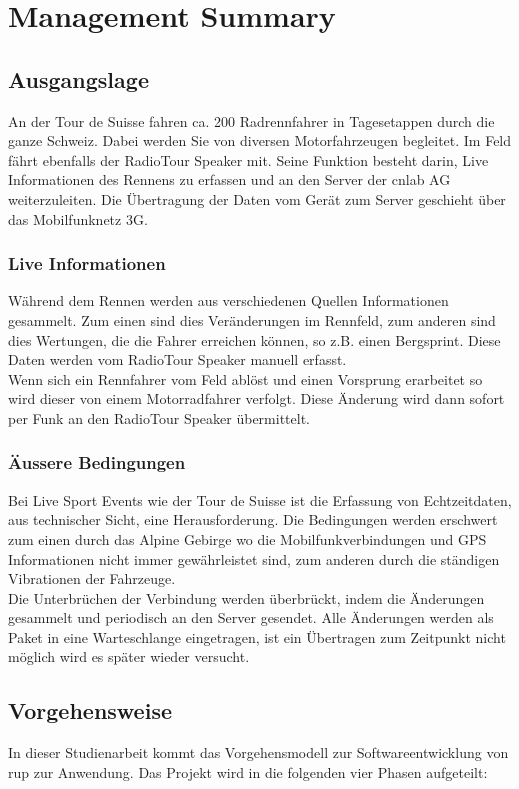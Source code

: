 \chapter*{Management Summary}

\section*{Ausgangslage}
An der Tour de Suisse fahren ca. 200 Radrennfahrer in Tagesetappen durch die ganze Schweiz. Dabei werden Sie von diversen Motorfahrzeugen begleitet. Im Feld fährt ebenfalls der RadioTour Speaker mit. Seine Funktion besteht darin, Live Informationen des Rennens zu erfassen und an den Server der cnlab AG weiterzuleiten.  Die Übertragung der Daten vom Gerät zum Server geschieht über das Mobilfunknetz 3G.

\subsection*{Live Informationen}
Während dem Rennen werden aus verschiedenen Quellen Informationen gesammelt. Zum einen sind dies Veränderungen im Rennfeld, zum anderen sind dies Wertungen, die die Fahrer erreichen können, so z.B. einen Bergsprint. Diese Daten werden vom RadioTour Speaker manuell erfasst.
\\
Wenn sich ein Rennfahrer vom Feld ablöst und einen Vorsprung erarbeitet so wird dieser von einem Motorradfahrer verfolgt. Diese Änderung wird dann sofort per Funk an den RadioTour Speaker übermittelt.

\subsection*{Äussere Bedingungen}
Bei Live Sport Events wie der Tour de Suisse ist die Erfassung von Echtzeitdaten, aus technischer Sicht, eine Herausforderung. Die Bedingungen werden erschwert zum einen durch das Alpine Gebirge wo die Mobilfunkverbindungen und GPS Informationen nicht immer gewährleistet sind, zum anderen durch die ständigen Vibrationen der Fahrzeuge.
\\
Die Unterbrüchen der Verbindung werden überbrückt, indem die Änderungen gesammelt und periodisch an den Server gesendet. Alle Änderungen werden als Paket in eine Warteschlange eingetragen, ist ein Übertragen zum Zeitpunkt nicht möglich wird es später wieder versucht.


\section*{Vorgehensweise}
In dieser Studienarbeit kommt das Vorgehensmodell zur Softwareentwicklung von \gls{rup} zur Anwendung. Das Projekt wird in die folgenden vier Phasen aufgeteilt:

